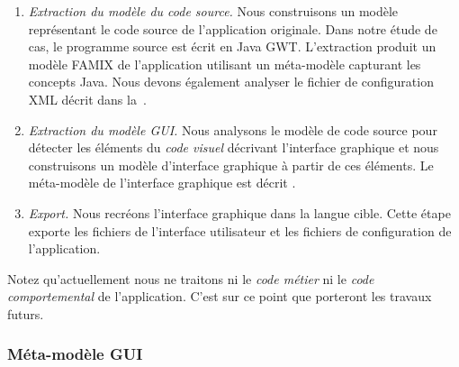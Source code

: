 \documentclass[a4paper]{article}
\begin{document}
\begin{enumerate}
\def\labelenumi{\arabic{enumi}.}

\item \emph{Extraction du modèle du code source.} Nous construisons un modèle représentant le code source de l'application originale.
Dans notre étude de cas, le programme source est écrit en Java GWT.
L'extraction produit un modèle FAMIX \cite{Duca11c} de l'application utilisant un méta-modèle capturant les concepts Java.
Nous devons également analyser le fichier de configuration XML décrit dans la~.

\item \emph{Extraction du modèle GUI.} 
Nous analysons le modèle de code source pour détecter les éléments du \emph{code visuel} décrivant l'interface graphique 
  et nous construisons un modèle d'interface graphique à partir de ces éléments. 
Le méta-modèle de l'interface graphique est décrit .


\item \emph{Export.} Nous recréons l'interface graphique 
  dans la langue cible.
Cette étape exporte les fichiers de l'interface utilisateur et 
les fichiers de configuration de l'application.

\end{enumerate}

Notez qu'actuellement nous ne traitons ni le \emph{code métier} ni le \emph{code comportemental} de l'application.
C'est sur ce point que porteront les travaux futurs.
  
\subsubsection{Méta-modèle GUI}
\label{sec:metamodelUI}
\end{document}
